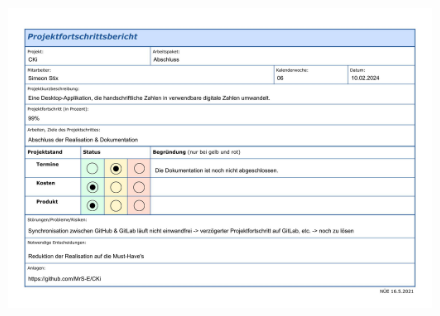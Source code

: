 \documentclass[a4paper,oneside,12pt]{report}
\begin{document}
\begin{appendices}
\begin{figure}[htbp]
	\includegraphics[width=\linewidth, height=\textheight, keepaspectratio]{Fortschrittsbericht_05_Stix_2024-02-10-1.jpg}
\end{figure}
\end{appendices}
\end{document}
